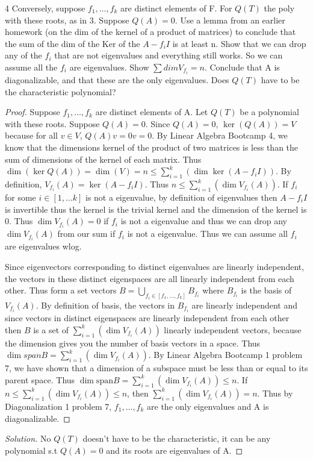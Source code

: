 \documentclass{article}
\newenvironment{solution}
{\renewcommand\qedsymbol{$\blacksquare$}\begin{proof}[Solution]}
		{\end{proof}}
\begin{document}
\bigskip
\begin{PROB}{4}\label{Problem 4.}
    Conversely, suppose $f_1,\ldots,f_k$ are distinct elements of F. For $Q(T)$ the poly with these roots, as in 3. Suppose $Q(A)=0$. Use a lemma from an earlier homework (on the dim of the  kernel of a product of matrices) to conclude that the sum of the dim of the Ker of the $A - f_i I$ is at least n. Show that we can drop any of the $f_i$ that are not eigenvalues and everything still works. So we can assume all the $f_i$ are eigenvalues. Show $\sum dim V_{f_i} =n$.  Conclude that A is diagonalizable, and that these are the only eigenvalues. Does $Q(T)$ have to be the characteristic polynomial?
\end{PROB}
\begin{proof}
    Suppose $f_1,\ldots,f_k$ are distinct elements of A. Let $Q(T)$ be a polynomial with these roots. Suppose $Q(A) = 0$. Since $Q(A) = 0$, $\ker(Q(A)) = V$ because for all $v \in V$, $Q(A)v = 0v = 0$. By Linear Algebra Bootcamp 4, we know that the dimensions kernel of the product of two matrices is less than the sum of dimensions of the kernel of each matrix. Thus $\dim(\ker Q(A)) = \dim(V) = n \leq  \sum_{i=1}^{k}(\dim \ker(A - f_iI))$. By definition, $V_{f_i}(A) = \ker(A - f_iI)$. Thus $n \leq  \sum_{i=1}^{k}(\dim V_{f_i}(A))$. If $f_i$ for some $i \in [1, \ldots k]$ is not a eigenvalue, by definition of eigenvalues then $A - f_iI$ is invertible thus the kernel is the trivial kernel and the dimension of the kernel is 0. Thus $\dim V_{f_i}(A) = 0$ if $f_i$ is not a eigenvalue and thus we can drop any $\dim V_{f_i}(A)$ from our sum if $f_i$ is not a eigenvalue. Thus we can assume all $f_i$ are eigenvalues wlog.

    Since eigenvectors corresponding to distinct eigenvalues are linearly independent, the vectors in these distinct eigenspaces are all linearly independent from each other. Thus form a set vectors $B = \bigcup_{f_i \in [f_1, \ldots, f_k]} B_{f_i}$ where $B_{f_i}$ is the basis of $V_{f_i}(A)$. By definition of basis, the vectors in $B_{f_i}$ are linearly independent and since vectors in distinct eigenspaces are linearly independent from each other then $B$ is a set of $\sum_{i=1}^{k}(\dim V_{f_i}(A))$ linearly independent vectors, because the dimension gives you the number of basis vectors in a space. Thus $\dim span B = \sum_{i=1}^{k}(\dim V_{f_i}(A))$. By Linear Algebra Bootcamp 1 problem 7, we have shown that a dimension of a subspace must be less than or equal to its parent space. Thus $\dim \mathrm{span} B = \sum_{i=1}^{k}(\dim V_{f_i}(A)) \leq n $. If $n \leq \sum_{i=1}^{k}(\dim V_{f_i}(A)) \leq n$, then $\sum_{i=1}^{k}(\dim V_{f_i}(A)) = n$. Thus by Diagonalization 1 problem 7, $f_1, \ldots, f_k$ are the only eigenvalues and A is diagonalizable.
\end{proof}
\begin{solution}
    No $Q(T)$ doesn't have to be the characteristic, it can be any polynomial s.t $Q(A) = 0$ and its roots are eigenvalues of A.
\end{solution}
\end{document}
